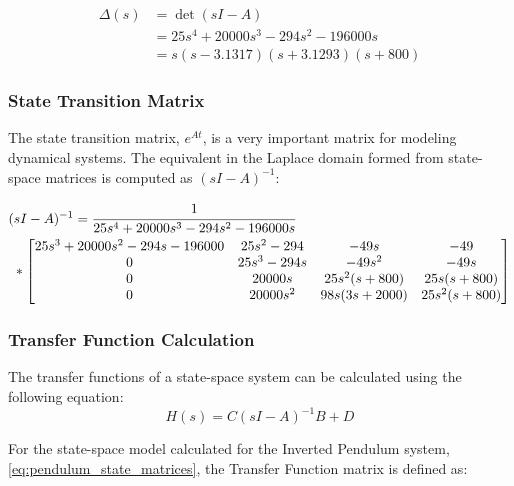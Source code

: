 \documentclass[]{article}
\begin{document}
			\begin{equation}
				\begin{aligned}
					\Delta (s) 	&= \det(s I - A)\\
								&= 25s^4 + 20000s^3 - 294s^2 - 196000s\\
								&= s (s-3.1317) (s + 3.1293) (s + 800)
				\end{aligned}
				\label{eq:pendulum_Delta(s)}
			\end{equation}
		
		\newpage
		\subsubsection{State Transition Matrix}
			The state transition matrix, $e^{At}$, is a very important matrix for modeling dynamical systems. The equivalent in the Laplace domain formed from state-space matrices is computed as $(sI - A)^{-1}$:
			
			\begin{equation}
				\begin{aligned}
					&(sI - A)^{-1} = \cfrac{1}{25s^4 + 20000s^3 - 294s^2 - 196000s} \\
					&\ *\mqty[	25 s^3 + 20000 s^2 - 294 s - 196000 & 25 s^2 - 294   & -49 s             & -49              \\
					                                  0 & 25 s^3 - 294 s & -49 s^2           & -49 s           \\
					                                  0 & 20000 s        & 25 s^2 (s + 800)  & 25 s (s + 800)   \\
					                                  0 & 20000 s^2      & 98 s (3 s + 2000) & 25 s^2 (s + 800)
					]
				\end{aligned}
				\label{eq:pendulum_(sI-A)-1}
			\end{equation}
		
		\subsubsection{Transfer Function Calculation}
			The transfer functions of a state-space system can be calculated using the following equation:
			\begin{equation}
				H(s) = C (sI-A)^{-1} B + D
				\label{eq:tf_def}
			\end{equation}
			
			For the state-space model calculated for the Inverted Pendulum system, \eqref{eq:pendulum_state_matrices}, the Transfer Function matrix is defined as:
			
\end{document}

